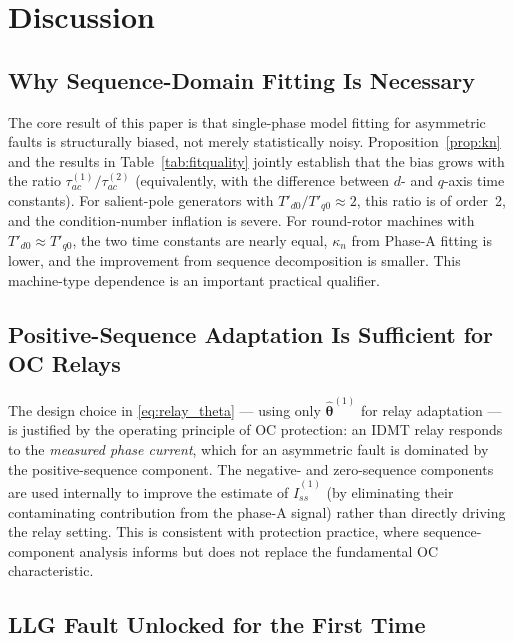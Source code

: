 \documentclass[10pt,journal,twoside]{IEEEtran}
\begin{document}
\section{Discussion}
\label{sec:discussion}

\subsection{Why Sequence-Domain Fitting Is Necessary}
\label{sec:discussion:why}

The core result of this paper is that single-phase model fitting for
asymmetric faults is structurally biased, not merely statistically noisy.
Proposition~\ref{prop:kn} and the results in Table~\ref{tab:fitquality}
jointly establish that the bias grows with the ratio $\tau_{ac}^{(1)}
/\tau_{ac}^{(2)}$ (equivalently, with the difference between $d$- and
$q$-axis time constants).  For salient-pole generators with
$T'_{d0}/T'_{q0} \approx 2$, this ratio is of order~2, and the
condition-number inflation is severe.  For round-rotor machines with
$T'_{d0} \approx T'_{q0}$, the two time constants are nearly equal,
$\kappa_n$ from Phase-A fitting is lower, and the improvement from
sequence decomposition is smaller.  This machine-type dependence is
an important practical qualifier.

\subsection{Positive-Sequence Adaptation Is Sufficient for OC Relays}
\label{sec:discussion:pos}

The design choice in \eqref{eq:relay_theta} --- using only
$\hat{\bm\theta}^{(1)}$ for relay adaptation --- is justified by the
operating principle of OC protection: an IDMT relay responds to the
\emph{measured phase current}, which for an asymmetric fault is
dominated by the positive-sequence component.  The negative- and
zero-sequence components are used internally to improve the estimate
of $\hat{I}_{ss}^{(1)}$ (by eliminating their contaminating contribution
from the phase-A signal) rather than directly driving the relay setting.
This is consistent with protection practice, where sequence-component
analysis informs but does not replace the fundamental OC characteristic.

\subsection{LLG Fault Unlocked for the First Time}
\label{sec:discussion:llg}
\end{document}
